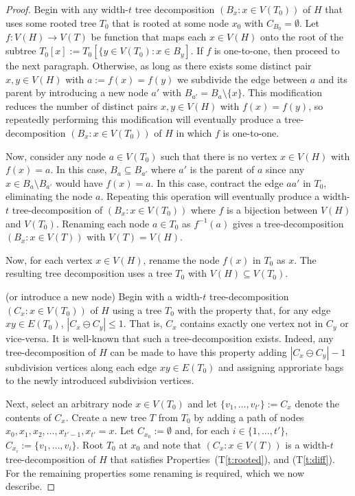 \documentclass{patmorin}
\newcommand{\tref}[1]{(T\ref{t:#1})}
\begin{document}
\begin{proof}
  Begin with any width-$t$ tree decomposition $(B_x:x\in V(T_0))$ of $H$ that uses some rooted tree $T_0$ that is rooted at some node $x_0$ with $C_{B_0}=\emptyset$.  Let $f:V(H)\to V(T)$ be function that maps each $x\in V(H)$ onto the root of the subtree $T_0[x]:=T_0[\{y\in V(T_0): x\in B_y]$.  If $f$ is one-to-one, then proceed to the next paragraph. Otherwise, as long as there exists some distinct pair $x,y\in V(H)$ with $a:=f(x)=f(y)$ we subdivide the edge between $a$ and its parent by introducing a new node $a'$ with $B_{a'}=B_{a}\setminus\{x\}$.  This modification reduces the number of distinct pairs $x,y\in V(H)$ with $f(x)=f(y)$, so repeatedly performing this modification will eventually produce a tree-decomposition $(B_x:x\in V(T_0))$ of $H$ in which $f$ is one-to-one.
  
  Now, consider any node $a\in V(T_0)$ such that there is no vertex $x\in V(H)$ with $f(x)=a$.  In this case, $B_{a}\subseteq B_{a'}$ where $a'$ is the parent of $a$ since any $x\in B_a\setminus B_{a'}$ would have $f(x)=a$.  In this case, contract the edge $aa'$ in $T_0$, eliminating the node $a$.  Repeating this operation will eventually produce a width-$t$ tree-decomposition of $(B_x:x\in V(T_0))$ where $f$ is a bijection between $V(H)$ and $V(T_0)$.  Renaming each node $a\in T_0$ as $f^{-1}(a)$ gives a tree-decomposition $(B_x:x\in V(T))$ with $V(T)=V(H)$.  
  

  Now, for each vertex $x\in V(H)$, rename the node $f(x)$ in $T_0$ as $x$. The resulting tree decomposition uses a tree $T_0$ with $V(H)\subseteq V(T_0)$. 
  
     (or introduce a new node)   
  Begin with a width-$t$ tree-decomposition $(C_x:x\in V(T_0))$ of $H$ using a tree $T_0$ with the property that, for any edge $xy\in E(T_0)$, $|C_x\ominus C_y|\le 1$. That is, $C_x$ contains exactly one vertex not in $C_y$ or vice-versa. It is well-known that such a tree-decomposition exists.  Indeed, any tree-decomposition of $H$ can be made to have this property adding $|C_x\ominus C_y|-1$ subdivision vertices along each edge $xy\in E(T_0)$ and assigning approriate bags to the newly introduced subdivision vertices.
  
  Next, select an arbitrary node $x\in V(T_0)$ and let $\{v_1,\ldots,v_{t'}\}:=C_x$ denote the contents of $C_x$. Create a new tree $T$ from $T_0$ by adding a path of nodes $x_0,x_1,x_2,\ldots,x_{t'-1},x_{t'}=x$. Let $C_{x_0}:=\emptyset$ and, for each $i\in\{1,\ldots,t'\}$, $C_{x_i}:=\{v_1,\ldots,v_i\}$.  Root $T_0$ at $x_0$ and note that $(C_x: x\in V(T))$ is a width-$t$ tree-decomposition of $H$ that satisfies Properties~\tref{rooted}, and \tref{diff}.  For the remaining properties some renaming is required, which we now describe.
  

\end{proof}
\end{document}
